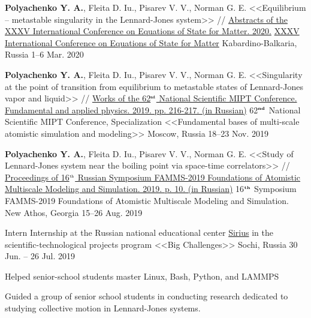 \begin{cventries}

  \cventry
    {\textbf{Polyachenko Y. A.}, Fleita D. Iu., Pisarev V. V., Norman G. E. <<Equilibrium – metastable singularity in the Lennard-Jones system>> // \href{http://www.ihed.ras.ru/elbrus20/program/restore.php?id=78}{Abstracts of the XXXV International Conference on Equations of State for Matter. 2020.}} %
    {\href{http://www.ihed.ras.ru/elbrus20/}{XXXV International Conference on Equations of State for Matter}} %
    {Kabardino-Balkaria, Russia} %
    {1--6 Mar. 2020} %
    {}


  \cventry
    {\textbf{Polyachenko Y. A.}, Fleita D. Iu., Pisarev V. V., Norman G. E. <<Singularity at the point of transition from equilibrium to metastable states of Lennard-Jones vapor and liquid>> // \href{https://mipt.ru/science/5top100/education/courseproposal/\%D0\%A4\%D0\%A4\%D0\%9F\%D0\%A42.pdf\#page=218}{Works of the 62$^{\texttt{\tiny nd}}$ National Scientific MIPT Conference. Fundamental and applied physics. 2019. pp. 216-217. (in Russian)}} %
    {62$^{\textbf{\tiny nd}}$ National Scientific MIPT Conference, Specialization <<Fundamental bases of multi-scale atomistic simulation and modeling>>} %
    {Moscow, Russia} %
    {18--23 Nov. 2019} %
    {}


  \cventry
    {\textbf{Polyachenko Y. A.}, Fleita D. Iu., Pisarev V. V., Norman G. E. <<Study of Lennard-Jones system near the boiling point via space-time correlators>> // \href{https://ihed.ras.ru/afon19/abstracts/book_of_abstracts.pdf\#page=10}{Proceedings of 16$^{\texttt{\tiny th}}$ Russian Symposium FAMMS-2019 Foundations of Atomistic Multiscale Modeling and Simulation. 2019. p. 10. (in Russian)}} %
    {16$^{\textbf{\tiny th}}$ Symposium FAMMS-2019 Foundations of Atomistic Multiscale Modeling and Simulation.} %
    {New Athos, Georgia} %
    {15--26 Aug. 2019} %
    {}
    
  \cventry
    {Intern} %
    {Internship at the Russian national educational center \href{https://sochisirius.ru/uploads/f/SiriusAnnualReport2019_en.pdf}{Sirius} in the scientific-technological projects program <<Big Challenges>>} %
    {Sochi, Russia} %
    {30 Jun. -- 26 Jul. 2019} %
    {
      \begin{cvitems} %
        \item {Helped senior-school students master Linux, Bash, Python, and LAMMPS}
        \item {Guided a group of senior school students in conducting research dedicated to studying collective motion in Lennard-Jones systems.}
      \end{cvitems}
    }


\end{cventries}
